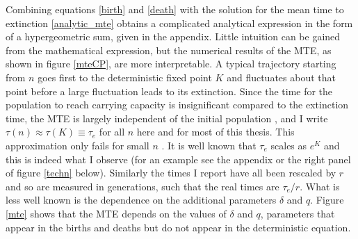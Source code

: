 Combining equations \ref{birth} and \ref{death} with the solution for the mean time to extinction \ref{analytic_mte} obtains a complicated analytical expression in the form of a hypergeometric sum, given in the appendix. 
Little intuition can be gained from the mathematical expression, but the numerical results of the MTE, as shown in figure \ref{mteCP}, are more interpretable. 
A typical trajectory starting from $n$ goes first to the deterministic fixed point $K$ and fluctuates about that point before a large fluctuation leads to its extinction. 
Since the time for the population to reach carrying capacity is insignificant compared to the extinction time, the MTE is largely independent of the initial population \cite{Chotibut2015}, and I write $\tau(n) \approx \tau(K) \equiv \tau_e$ for all $n$ here and for most of this thesis. %
This approximation only fails for small $n$ \cite{Chotibut2015}. %
It is well known that $\tau_e$ scales as $e^K$ \cite{Lande1993,Ovaskainen2010} and this is indeed what I observe (for an example see the appendix or the right panel of figure \ref{techn} below). 
Similarly the times I report have all been rescaled by $r$ and so are measured in generations, such that the real times are $\tau_e/r$. 
What is less well known is the dependence on the additional parameters $\delta$ and $q$. %
Figure \ref{mte} shows that the MTE depends on the values of $\delta$ and $q$, parameters that appear in the births and deaths but do not appear in the deterministic equation. %


